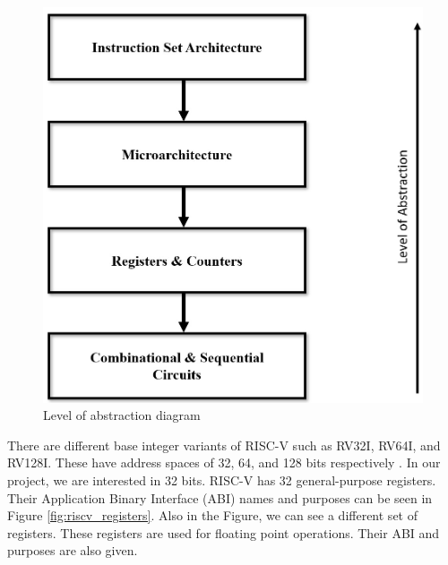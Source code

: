 \begin{figure}[h!]
    \centering
    \includegraphics[scale=0.25]{riscv/level_of_abstraction_diagram.jpeg}
    \caption{Level of abstraction diagram \cite{levelofabstrac}}
    \label{fig:level_of_abstraction_diagram}
\end{figure}

There are different base integer variants of RISC-V such as RV32I, RV64I, and RV128I. These have address spaces of 32, 64, and 128 bits respectively \cite{Altinayozlem}. In our project, we are interested in 32 bits. RISC-V has 32 general-purpose registers. Their Application Binary Interface (ABI) names and purposes can be seen in Figure \ref{fig:riscv_registers}. Also in the Figure, we can see a different set of registers. These registers are used for floating point operations. Their ABI and purposes are also given.


